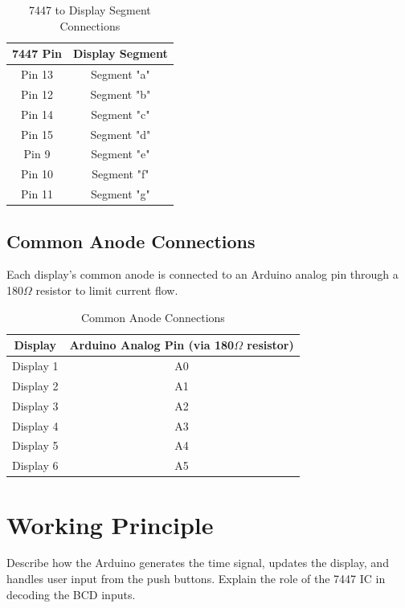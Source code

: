 \documentclass[journal]{IEEEtran}
\begin{document}
\begin{table}[H]
    \centering
    \caption{7447 to Display Segment Connections}
    \begin{tabular}{|c|c|}
        \hline
        \textbf{7447 Pin} & \textbf{Display Segment} \\
        \hline
        Pin 13 & Segment "a" \\
        Pin 12 & Segment "b" \\
        Pin 14 & Segment "c" \\
        Pin 15 & Segment "d" \\
        Pin 9  & Segment "e" \\
        Pin 10 & Segment "f" \\
        Pin 11 & Segment "g" \\
        \hline
    \end{tabular}
\end{table}

\subsection{Common Anode Connections}
Each display's common anode is connected to an Arduino analog pin through a 180$\Omega$ resistor to limit current flow.

\begin{table}[H]
    \centering
    \caption{Common Anode Connections}
    \begin{tabular}{|c|c|}
        \hline
        \textbf{Display} & \textbf{Arduino Analog Pin (via 180$\Omega$ resistor)} \\
        \hline
        Display 1 & A0 \\
        Display 2 & A1 \\
        Display 3 & A2 \\
        Display 4 & A3 \\
        Display 5 & A4 \\
        Display 6 & A5 \\
        \hline
    \end{tabular}
\end{table}

\section{Working Principle}
Describe how the Arduino generates the time signal, updates the display, and handles user input from the push buttons. Explain the role of the 7447 IC in decoding the BCD inputs.
\end{document}
